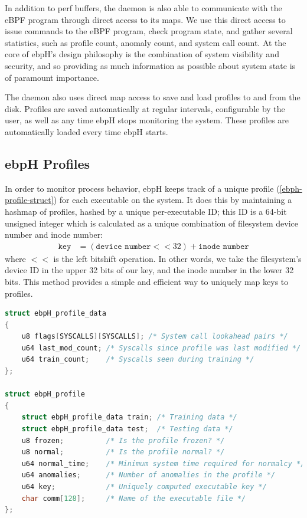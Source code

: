 \documentclass[
  12pt]{findlay}
\begin{document}

In addition to perf buffers, the daemon is also able to communicate with
the eBPF program through direct access to its maps. We use this direct
access to issue commands to the eBPF program, check program state, and
gather several statistics, such as profile count, anomaly count, and
system call count. At the core of ebpH's design philosophy is the
combination of system visibility and security, and so providing as much
information as possible about system state is of paramount importance.

The daemon also uses direct map access to save and load profiles to and
from the disk. Profiles are saved automatically at regular intervals,
configurable by the user, as well as any time ebpH stops monitoring the
system. These profiles are automatically loaded every time ebpH starts.

\hypertarget{ebph-profiles}{%
\subsection{ebpH Profiles}\label{ebph-profiles}}

In order to monitor process behavior, ebpH keeps track of a unique
profile (\autoref{ebph-profile-struct}) for each executable on the
system. It does this by maintaining a hashmap of profiles, hashed by a
unique per-executable ID; this ID is a 64-bit unsigned integer which is
calculated as a unique combination of filesystem device number and inode
number: \begin{align*}
\texttt{key} &= (\texttt{device number} << 32) + \texttt{inode number}
\end{align*} where \(<<\) is the left bitshift operation. In other
words, we take the filesystem's device ID in the upper 32 bits of our
key, and the inode number in the lower 32 bits. This method provides a
simple and efficient way to uniquely map keys to profiles.

\begin{lstlisting}[float={ht}, language=c, label={ebph-profile-struct}, caption={A simplified
definition of the ebpH profile struct.}]
struct ebpH_profile_data
{
    u8 flags[SYSCALLS][SYSCALLS]; /* System call lookahead pairs */
    u64 last_mod_count; /* Syscalls since profile was last modified */
    u64 train_count;    /* Syscalls seen during training */
};

struct ebpH_profile
{
    struct ebpH_profile_data train; /* Training data */
    struct ebpH_profile_data test;  /* Testing data */
    u8 frozen;          /* Is the profile frozen? */
    u8 normal;          /* Is the profile normal? */
    u64 normal_time;    /* Minimum system time required for normalcy */
    u64 anomalies;      /* Number of anomalies in the profile */
    u64 key;            /* Uniquely computed executable key */
    char comm[128];     /* Name of the executable file */
};
\end{lstlisting}
\end{document}
